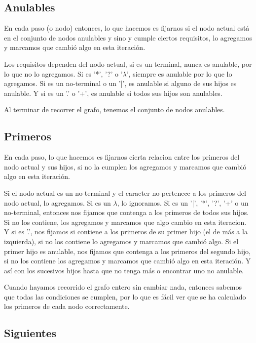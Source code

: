 \documentclass[a4paper]{report}
\begin{document}
\subsection*{Anulables}

	En cada paso (o nodo) entonces, lo que hacemos es fijarnos si el nodo
actual está en el conjunto de nodos anulables y sino y cumple ciertos
requisitos, lo agregamos y marcamos que cambió algo en esta iteración.


	Los requisitos dependen del nodo actual, si es un terminal, nunca es
anulable, por lo que no lo agregamos. Si es '*', '?' o '$\lambda$', siempre es anulable
por lo que lo agregamos. Si es un no-terminal o un '|', es anulable si alguno de
sus hijos es anulable. Y si es un '.' o '+', es anulable si todos sus hijos son
anulables.


	Al terminar de recorrer el grafo, tenemos el conjunto de nodos
anulables.

\subsection*{Primeros}

	En cada paso, lo que hacemos es fijarnos cierta relacion entre los primeros
del nodo actual y sus hijos, si no la cumplen los agregamos y marcamos que
cambió algo en esta iteración.


	Si el nodo actual es un no terminal y el caracter no pertenece a los
primeros del nodo actual, lo agregamos. Si es un $\lambda$, lo ignoramos. Si es un
'|', '*', '?', '+' o un no-terminal, entonces nos fijamos que contenga a los
primeros de todos sus hijos. Si no los contiene, los agregamos y marcamos que
algo cambio en esta iteracion. Y si es '.', nos fijamos si contiene a los
primeros de su primer hijo (el de más a la izquierda), si no los contiene lo
agregamos y marcamos que cambió algo. Si el primer hijo es anulable, nos fijamos
que contenga a los primeros del segundo hijo, si no los contiene los agregamos y
marcamos que cambió algo en esta iteración. Y así con los sucesivos hijos hasta
que no tenga más o encontrar uno no anulable.


	Cuando hayamos recorrido el grafo entero sin cambiar nada, entonces
sabemos que todas las condiciones se cumplen, por lo que es fácil ver que se ha
calculado los primeros de cada nodo correctamente.


\subsection*{Siguientes}
\end{document}
